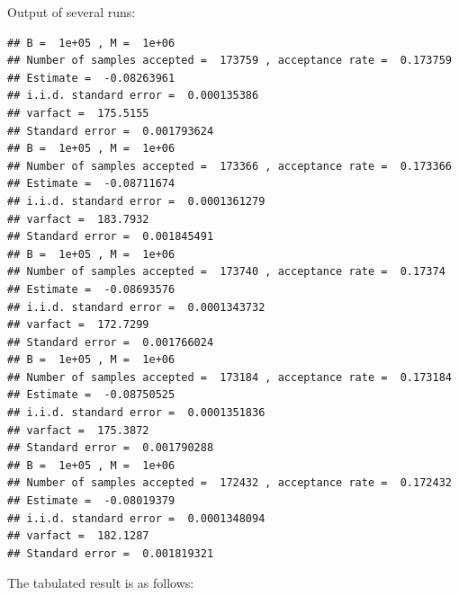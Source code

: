 \begin{knitrout}
\begin{kframe}
\begin{alltt}
\hlstd{(}\hlstd{)}
\hlstd{(}\hlstd{)}
\hlstd{(}\hlstd{)}
\hlstd{(}\hlstd{)}
\hlstd{(}\hlstd{)}
\hlstd{(}\hlstd{)}
\end{alltt}
\end{kframe}
\end{knitrout}
Output of several runs:
\begin{knitrout}
\color{fgcolor}\begin{kframe}
\begin{verbatim}
## B =  1e+05 , M =  1e+06 
## Number of samples accepted =  173759 , acceptance rate =  0.173759 
## Estimate =  -0.08263961 
## i.i.d. standard error =  0.000135386 
## varfact =  175.5155 
## Standard error =  0.001793624
## B =  1e+05 , M =  1e+06 
## Number of samples accepted =  173366 , acceptance rate =  0.173366 
## Estimate =  -0.08711674 
## i.i.d. standard error =  0.0001361279 
## varfact =  183.7932 
## Standard error =  0.001845491
## B =  1e+05 , M =  1e+06 
## Number of samples accepted =  173740 , acceptance rate =  0.17374 
## Estimate =  -0.08693576 
## i.i.d. standard error =  0.0001343732 
## varfact =  172.7299 
## Standard error =  0.001766024
## B =  1e+05 , M =  1e+06 
## Number of samples accepted =  173184 , acceptance rate =  0.173184 
## Estimate =  -0.08750525 
## i.i.d. standard error =  0.0001351836 
## varfact =  175.3872 
## Standard error =  0.001790288
## B =  1e+05 , M =  1e+06 
## Number of samples accepted =  172432 , acceptance rate =  0.172432 
## Estimate =  -0.08019379 
## i.i.d. standard error =  0.0001348094 
## varfact =  182.1287 
## Standard error =  0.001819321
\end{verbatim}
\end{kframe}
\end{knitrout}
The tabulated result is as follows:\\
